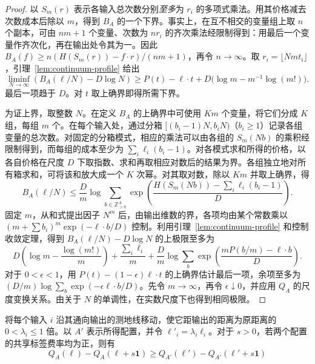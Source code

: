 \begin{proof}
以 $S_m(r)$ 表示各输入总次数分别\emph{至多}为 $r_i$ 的多项式乘法。用其价格减去次数成本后除以 $m$，得到 $B_A$ 的一个下界。事实上，在互不相交的变量组上取 $n$ 个副本，可由 $nm+1$ 个变量、次数为 $nr_i$ 的齐次乘法经限制得到：用最后一个变量作齐次化，再在输出处令其为一。因此 $B_A(f)\ge n(H(S_m(r))-f\cdot r)/(nm+1)$，再令 $n\to\infty$。取 $r_i=\lfloor Nm t_i\rfloor$，引理~\ref{lem:continuum-profile} 给出
\[
 \liminf_{N\to\infty}(B_A(\ell/N)-D\log N)
 \ge P(t)-\ell\cdot t+D\bigl(\log m-m^{-1}\log(m!)\bigr).
\]
最后一项趋于 $D$。对 $t$ 取上确界即得所需下界。

为证上界，取整数 $N$。在定义 $B_A$ 的上确界中可使用 $Km$ 个变量，将它们分成 $K$ 组，每组 $m$ 个。在每个输入处，通过分箱 $[(b_i-1)N,b_iN)$（$b_i\ge1$）记录各组变量的总次数。对固定的分箱模式，相应的乘法可以由各组的 $S_m(Nb)$ 的乘积经限制得到，而每组的成本至少为 $\sum_i\ell_i(b_i-1)$。对各模式求和所得的价格，以各自价格在尺度 $D$ 下取指数、求和再取相应对数后的结果为界。各组独立地对所有箱求和，可将该和放大成一个 $K$ 次幂。对其取对数，除以 $Km$ 并取上确界，得
\[
 B_A(\ell/N)\le \frac Dm\log\sum_{b\in\mathbb Z_{>0}^A}
 \exp\left(\frac{H(S_m(Nb))-\sum_i\ell_i(b_i-1)}{D}\right).
\]
固定 $m$，从和式提出因子 $N^m$ 后，由输出维数的界，各项均由某个常数乘以 $(m+\sum b_i)^m\exp(-\ell\cdot b/D)$ 控制。利用引理~\ref{lem:continuum-profile} 和控制收敛定理，得到 $B_A(\ell/N)-D\log N$ 的上极限至多为
\[
 D\left(\log m-\frac{\log(m!)}m\right)
 +\frac{\sum_i\ell_i}m+
 \frac Dm\log\sum_b\exp\left(\frac{mP(b/m)-\ell\cdot b}{D}\right).
\]
对于 $0<\epsilon<1$，用 $P(t)-(1-\epsilon)\ell\cdot t$ 的上确界估计最后一项，余项至多为 $(D/m)\log\sum_b\exp(-\epsilon\ell\cdot b/D)$。先令 $m\to\infty$，再令 $\epsilon\downarrow0$，并应用 $Q_A$ 的尺度变换关系。由关于 $N$ 的单调性，在实数尺度下也得到相同极限。
\end{proof}

\begin{lemma}[径向收缩]\label{lem:energy-compare}
将每个输入 $i$ 沿其通向输出的测地线移动，使它距输出的距离为原距离的 $0<\lambda_i\le1$ 倍。以 $A'$ 表示所得配置，并令 $\ell'_i=\lambda_i\ell_i$。对于 $s>0$，若两个配置的共享标签费率均为正，则有
\begin{equation}\label{eq:src7}
 Q_A(\ell)-Q_A(\ell+s\mathbf1)\ge
 Q_{A'}(\ell')-Q_{A'}(\ell'+s\mathbf1)
\end{equation}
\end{lemma}

